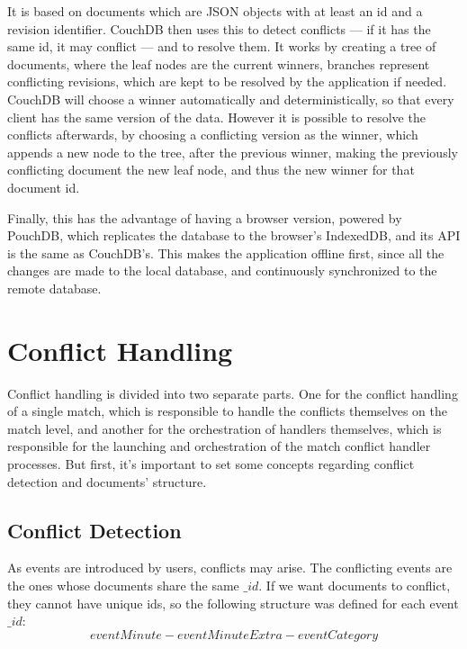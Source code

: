 It is based on documents which are JSON objects with at least an id and a revision identifier. CouchDB then uses this to detect conflicts --- if it has the same id, it may conflict --- and to resolve them. It works by creating a tree of documents, where the leaf nodes are the current winners, branches represent conflicting revisions, which are kept to be resolved by the application if needed. CouchDB will choose a winner automatically and deterministically, so that every client has the same version of the data. However it is possible to resolve the conflicts afterwards, by choosing a conflicting version as the winner, which appends a new node to the tree, after the previous winner, making the previously conflicting document the new leaf node, and thus the new winner for that document id.

Finally, this has the advantage of having a browser version, powered by PouchDB, which replicates the database to the browser's IndexedDB, and its API is the same as CouchDB's. This makes the application offline first, since all the changes are made to the local database, and continuously synchronized to the remote database.

\section{Conflict Handling}

Conflict handling is divided into two separate parts. One for the conflict handling of a single match, which is responsible to handle the conflicts themselves on the match level, and another for the orchestration of handlers themselves, which is responsible for the launching and orchestration of the match conflict handler processes. But first, it's important to set some concepts regarding conflict detection and documents' structure.

\subsection{Conflict Detection}

As events are introduced by users, conflicts may arise. The conflicting events are the ones whose documents share the same $\_id$. If we want documents to conflict, they cannot have unique ids, so the following structure was defined for each event $\_id$:
\begin{equation}
    eventMinute-eventMinuteExtra-eventCategory
\end{equation}

